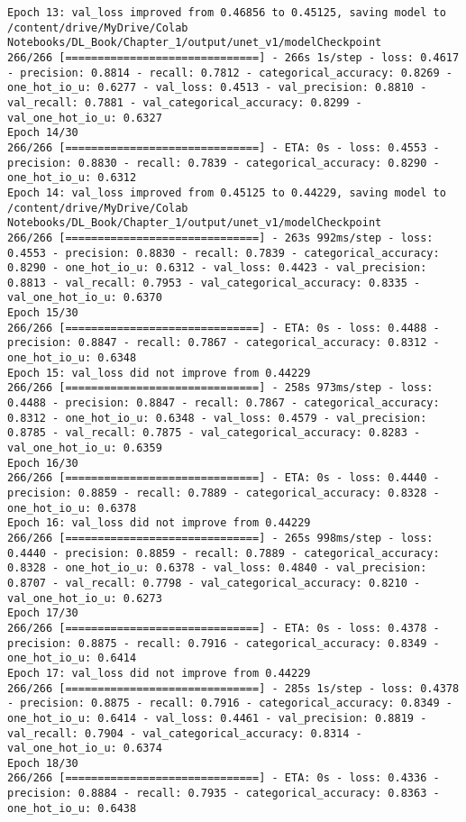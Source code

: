 \documentclass[
  letterpaper,
  DIV=11,
  numbers=noendperiod]{scrreprt}
\begin{document}
\begin{verbatim}
Epoch 13: val_loss improved from 0.46856 to 0.45125, saving model to /content/drive/MyDrive/Colab Notebooks/DL_Book/Chapter_1/output/unet_v1/modelCheckpoint
266/266 [==============================] - 266s 1s/step - loss: 0.4617 - precision: 0.8814 - recall: 0.7812 - categorical_accuracy: 0.8269 - one_hot_io_u: 0.6277 - val_loss: 0.4513 - val_precision: 0.8810 - val_recall: 0.7881 - val_categorical_accuracy: 0.8299 - val_one_hot_io_u: 0.6327
Epoch 14/30
266/266 [==============================] - ETA: 0s - loss: 0.4553 - precision: 0.8830 - recall: 0.7839 - categorical_accuracy: 0.8290 - one_hot_io_u: 0.6312
Epoch 14: val_loss improved from 0.45125 to 0.44229, saving model to /content/drive/MyDrive/Colab Notebooks/DL_Book/Chapter_1/output/unet_v1/modelCheckpoint
266/266 [==============================] - 263s 992ms/step - loss: 0.4553 - precision: 0.8830 - recall: 0.7839 - categorical_accuracy: 0.8290 - one_hot_io_u: 0.6312 - val_loss: 0.4423 - val_precision: 0.8813 - val_recall: 0.7953 - val_categorical_accuracy: 0.8335 - val_one_hot_io_u: 0.6370
Epoch 15/30
266/266 [==============================] - ETA: 0s - loss: 0.4488 - precision: 0.8847 - recall: 0.7867 - categorical_accuracy: 0.8312 - one_hot_io_u: 0.6348
Epoch 15: val_loss did not improve from 0.44229
266/266 [==============================] - 258s 973ms/step - loss: 0.4488 - precision: 0.8847 - recall: 0.7867 - categorical_accuracy: 0.8312 - one_hot_io_u: 0.6348 - val_loss: 0.4579 - val_precision: 0.8785 - val_recall: 0.7875 - val_categorical_accuracy: 0.8283 - val_one_hot_io_u: 0.6359
Epoch 16/30
266/266 [==============================] - ETA: 0s - loss: 0.4440 - precision: 0.8859 - recall: 0.7889 - categorical_accuracy: 0.8328 - one_hot_io_u: 0.6378
Epoch 16: val_loss did not improve from 0.44229
266/266 [==============================] - 265s 998ms/step - loss: 0.4440 - precision: 0.8859 - recall: 0.7889 - categorical_accuracy: 0.8328 - one_hot_io_u: 0.6378 - val_loss: 0.4840 - val_precision: 0.8707 - val_recall: 0.7798 - val_categorical_accuracy: 0.8210 - val_one_hot_io_u: 0.6273
Epoch 17/30
266/266 [==============================] - ETA: 0s - loss: 0.4378 - precision: 0.8875 - recall: 0.7916 - categorical_accuracy: 0.8349 - one_hot_io_u: 0.6414
Epoch 17: val_loss did not improve from 0.44229
266/266 [==============================] - 285s 1s/step - loss: 0.4378 - precision: 0.8875 - recall: 0.7916 - categorical_accuracy: 0.8349 - one_hot_io_u: 0.6414 - val_loss: 0.4461 - val_precision: 0.8819 - val_recall: 0.7904 - val_categorical_accuracy: 0.8314 - val_one_hot_io_u: 0.6374
Epoch 18/30
266/266 [==============================] - ETA: 0s - loss: 0.4336 - precision: 0.8884 - recall: 0.7935 - categorical_accuracy: 0.8363 - one_hot_io_u: 0.6438

\end{verbatim}
\end{document}

